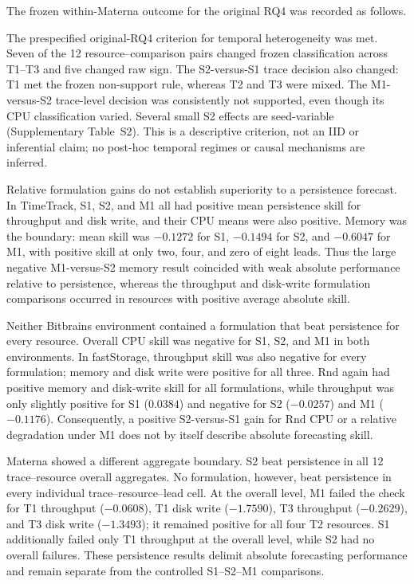 \documentclass[a4paper,11pt]{article}
\begin{document}
The frozen within-Materna outcome for the original RQ4 was recorded as
follows.

\noindent The prespecified original-RQ4 criterion for temporal heterogeneity was met.
Seven of the 12
resource--comparison pairs changed frozen classification across T1--T3 and
five changed raw sign. The S2-versus-S1 trace decision also changed: T1 met the
frozen non-support rule, whereas T2 and T3 were mixed. The M1-versus-S2
trace-level decision was consistently not supported, even though its CPU
classification varied. Several small S2 effects are seed-variable
(Supplementary Table~S2). This is a descriptive criterion, not an IID or
inferential claim; no post-hoc temporal regimes or causal mechanisms are
inferred.

Relative formulation gains do not establish superiority to a persistence
forecast. In TimeTrack, S1, S2, and M1 all had positive mean persistence skill
for throughput and disk write, and their CPU means were also positive. Memory
was the boundary: mean skill was $-0.1272$ for S1, $-0.1494$ for S2, and
$-0.6047$ for M1, with positive skill at only two, four, and zero of eight
leads. Thus the large negative M1-versus-S2 memory result coincided with weak
absolute performance relative to persistence, whereas the throughput and
disk-write formulation comparisons occurred in resources with positive
average absolute skill.

Neither Bitbrains environment contained a formulation that beat persistence
for every resource. Overall CPU skill was negative for S1, S2, and M1 in both
environments. In fastStorage, throughput skill was also negative for every
formulation; memory and disk write were positive for all three. Rnd again had
positive memory and disk-write skill for all formulations, while throughput
was only slightly positive for S1 ($0.0384$) and negative for S2 ($-0.0257$)
and M1 ($-0.1176$). Consequently, a positive S2-versus-S1 gain for Rnd CPU or a
relative degradation under M1 does not by itself describe absolute forecasting
skill.

Materna showed a different aggregate boundary. S2 beat persistence in all 12
trace--resource overall aggregates. No formulation, however, beat persistence
in every individual trace--resource--lead cell. At the overall level, M1 failed
the check for T1 throughput ($-0.0608$), T1 disk write ($-1.7590$), T3
throughput ($-0.2629$), and T3 disk write ($-1.3493$); it remained positive for
all four T2 resources. S1 additionally failed only T1 throughput at the overall
level, while S2 had no overall failures. These persistence results delimit
absolute forecasting performance and remain separate from the controlled
S1--S2--M1 comparisons.
\end{document}
